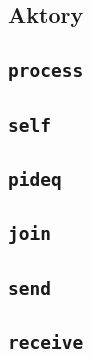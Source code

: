 \subsection{Aktory}
\label{viua_vm_ops_actor}

\subsection{\texttt{process}}
\subsection{\texttt{self}}
\subsection{\texttt{pideq}}
\subsection{\texttt{join}}
\subsection{\texttt{send}}
\subsection{\texttt{receive}}
